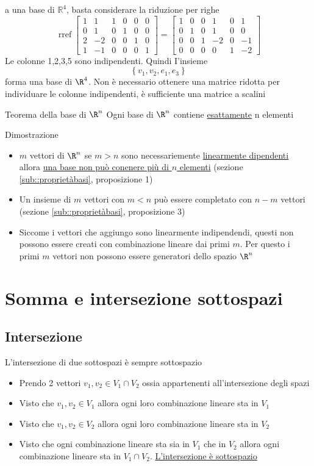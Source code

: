 a una base di $\mathbb{R}^4$, basta considerare la riduzione per righe
$$
	\operatorname{rref}\left[\begin{array}{rrrrrr}
			1 & 1  & 1 & 0 & 0 & 0 \\
			0 & 1  & 0 & 1 & 0 & 0 \\
			2 & -2 & 0 & 0 & 1 & 0 \\
			1 & -1 & 0 & 0 & 0 & 1
		\end{array}\right]=\left[\begin{array}{rrrrrr}
			1 & 0 & 0 & 1  & 0 & 1  \\
			0 & 1 & 0 & 1  & 0 & 0  \\
			0 & 0 & 1 & -2 & 0 & -1 \\
			0 & 0 & 0 & 0  & 1 & -2
		\end{array}\right]
$$
Le colonne 1,2,3,5 sono indipendenti. Quindi I'insieme
$$
	\left\{v_1, v_2, e_1, e_3\right\}
$$
forma una base di $\R^{4}$. Non è necessario ottenere una matrice ridotta per individuare le colonne indipendenti, è sufficiente una matrice a scalini

\begin{teorema}{Teorema della base di $\R^n$}
	Ogni base di $\R^{n}$ contiene \underline{esattamente} n elementi
\end{teorema}

Dimostrazione
\begin{itemize}
	\item  $m$ vettori di $\R ^{n}$ se $m > n$ sono necessariemente \underline{linearmente dipendenti} allora \underline{una base non può conenere più di $n$ elementi} (sezione \ref{sub::proprietàbasi}, proposizione 1)
	\item Un insieme di $m$ vettori con $m<n$ può essere completato con $n-m$ vettori (sezione \ref{sub::proprietàbasi}, proposizione 3)
	\item Siccome i vettori che aggiungo sono linearmente indipendendi, questi non possono essere creati con combinazione lineare dai primi $m$. Per questo i primi  $m$ vettori non possono essere generatori dello spazio $\R^{n}$
\end{itemize}
\section{Somma e intersezione sottospazi}
\subsection{Intersezione}
L'intersezione di due sottospazi è sempre sottospazio
\begin{itemize}
	\item Prendo 2 vettori $ v_1,v_2 \in V_1 \cap V_2$ ossia appartenenti all'intersezione degli spazi
	\item Visto che $ v_1,v_2 \in  V_1 $ allora ogni loro combinazione lineare sta in $ V_1 $
	\item Visto che $ v_1,v_2 \in  V_2 $ allora ogni loro combinazione lineare sta in $ V_2 $
	\item Visto che ogni combinazione lineare sta sia in $ V_1 $ che in $ V_2 $ allora ogni combinazione lineare sta in $ V_1 \cap V_2 $. \underline{L'intersezione è sottospazio}
\end{itemize}

